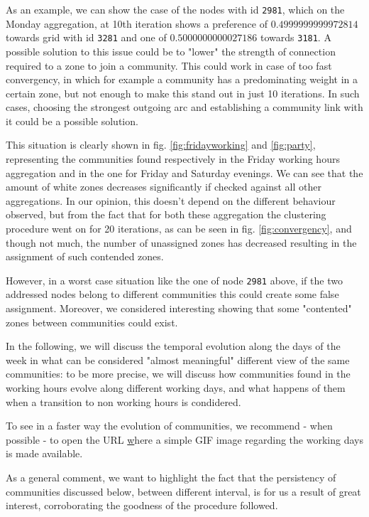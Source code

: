 \documentclass[12pt,a4paper]{article}
\begin{document}
As an example, we can show the case of the nodes with id \texttt{2981}, which on the Monday aggregation, at 10th iteration shows a preference of $0.4999999999972814$ towards grid with id \texttt{3281} and one of $0.5000000000027186$ towards \texttt{3181}.
A possible solution to this issue could be to "lower" the strength of connection required to a zone to join a community. This could work in case of too fast convergency, in which for example a community has a predominating weight in a certain zone, but not enough to make this stand out in just 10 iterations. In such cases, choosing the strongest outgoing arc and establishing a community link with it could be a possible solution. 

This situation is clearly shown in fig. \ref{fig:fridayworking} and \ref{fig:party}, representing the communities found respectively in the Friday working hours aggregation and in the one for Friday and Saturday evenings. We can see that the amount of white zones decreases significantly if checked against all other aggregations. In our opinion, this doesn't depend on the different behaviour observed, but from the fact that for both these aggregation the clustering procedure went on for 20 iterations, as can be seen in fig. \ref{fig:convergency}, and though not much, the number of unassigned zones has decreased resulting in the assignment of such contended zones.

However, in a worst case situation like the one of node \texttt{2981} above, if the two addressed nodes belong to different communities this could create some false assignment. Moreover, we considered interesting showing that some "contented" zones between communities could exist.

In the following, we will discuss the temporal evolution along the days of the week in what can be considered "almost meaningful" different view of the same communities: to be more precise, we will discuss how communities found in the working hours evolve along different working days, and what happens of them when a transition to non working hours is condidered.

To see in a faster way the evolution of communities, we recommend - when possible - to open the URL \href{http://sonasegaiodeh.com} where a simple GIF image regarding the working days is made available.

As a general comment, we want to highlight the fact that the persistency of communities discussed below, between different interval, is for us a result of great interest, corroborating the goodness of the procedure followed.
\end{document}
